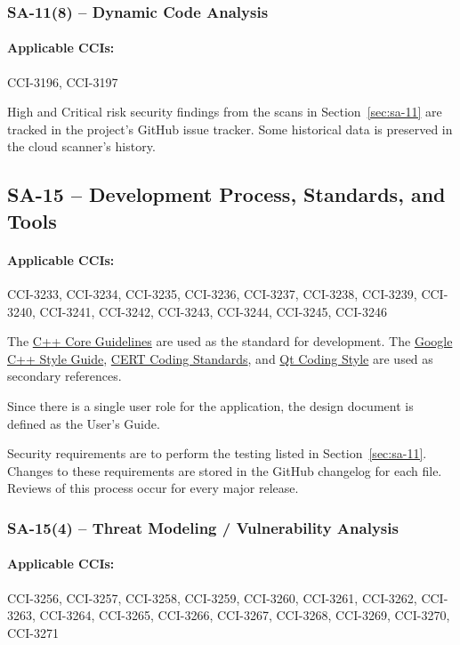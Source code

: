 \documentclass[letterpaper, 10pt, twoside]{article}
\begin{document}
\subsubsection{SA-11(8) -- Dynamic Code Analysis}

\paragraph{Applicable CCIs:} CCI-3196, CCI-3197

High and Critical risk security findings from the scans in Section~\ref{sec:sa-11} are tracked in the project's GitHub issue tracker. Some historical data is preserved in the cloud scanner's history.

\subsection{SA-15 -- Development Process, Standards, and Tools}

\paragraph{Applicable CCIs:} CCI-3233, CCI-3234, CCI-3235, CCI-3236, CCI-3237, CCI-3238, CCI-3239, CCI-3240, CCI-3241, CCI-3242, CCI-3243, CCI-3244, CCI-3245, CCI-3246

The \href{http://isocpp.github.io/CppCoreGuidelines/CppCoreGuidelines#S-functions}{C++ Core Guidelines} are used as the standard for development. The \href{https://google.github.io/styleguide/cppguide.html}{Google C++ Style Guide}, \href{https://resources.sei.cmu.edu/downloads/secure-coding/assets/sei-cert-cpp-coding-standard-2016-v01.pdf}{CERT Coding Standards}, and \href{https://wiki.qt.io/Qt_Coding_Style}{Qt Coding Style} are used as secondary references.

Since there is a single user role for the application, the design document is defined as the User's Guide.

Security requirements are to perform the testing listed in Section~\ref{sec:sa-11}. Changes to these requirements are stored in the GitHub changelog for each file. Reviews of this process occur for every major release.

\subsubsection{SA-15(4) -- Threat Modeling / Vulnerability Analysis}

\paragraph{Applicable CCIs:} CCI-3256, CCI-3257, CCI-3258, CCI-3259, CCI-3260, CCI-3261, CCI-3262, CCI-3263, CCI-3264, CCI-3265, CCI-3266, CCI-3267, CCI-3268, CCI-3269, CCI-3270, CCI-3271
\end{document}
